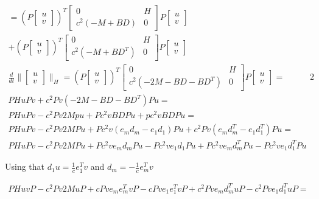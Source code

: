 \documentclass[a4paper]{article}
\begin{document}
\begin{equation}
\begin{aligned}
		= \left( P\begin{bmatrix} u \\v \end{bmatrix} \right)^{T} \begin{bmatrix} 0& H \\ c^2(-M+BD)& 0 \end{bmatrix} P \begin{bmatrix} u \\ v \end{bmatrix} \\
+  \left( P\begin{bmatrix} u \\v \end{bmatrix} \right)^{T} \begin{bmatrix} 0& H \\ c^2(-M+BD^T)& 0 \end{bmatrix} P \begin{bmatrix} u \\ v \end{bmatrix} \\ \hline
\frac{d}{dt} \|\begin{bmatrix} u \\ v \end{bmatrix} \|_H =  \left( P\begin{bmatrix} u \\v \end{bmatrix} \right)^{T} \begin{bmatrix} 0& H \\ c^2(-2M - BD - BD^T)& 0 \end{bmatrix} P \begin{bmatrix} u \\ v \end{bmatrix} = \\
PHuPv + c^2Pv(-2M-BD-BD^{T})Pu =\\
PHuPv - c^2Pv 2Mpu + Pc^2vBDPu + pc^2vBDPu = \\
PHuPv - c^2Pv 2MPu + Pc^2v(e_md_m-e_1d_1)Pu + c^2Pv(e_md^{T}_m-e_1d^{T}_1)Pu= \\
PHuPv - c^2Pv 2MPu + Pc^2ve_md_mPu -  Pc^2ve_1d_1Pu + Pc^2ve_md^{T}_mPu - Pc^2ve_1d^{T}_1Pu
\end{aligned} 2	
 \nonumber
\end{equation}

Using that $d_1u = \frac{1}{c}e^{T}_1v $ and $d_m = -\frac{1}{c} e^{T}_mv$


\begin{equation}
	\begin{aligned}
	PHuvP - c^2Pv 2MuP + cPve_m e^{T}_mv P -  cPve_1 e^{T}_1vP + c^2Pve_md^{T}_muP - c^2Pve_1d^{T}_1uP = \\
	\end{aligned}
	\nonumber
\end{equation}
\end{document}
